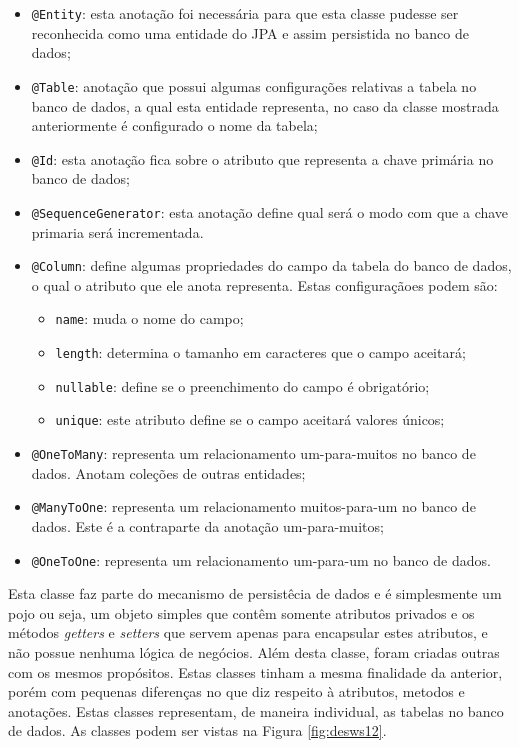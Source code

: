 	\begin{itemize}
	  \item \texttt{@Entity}: esta anotação foi necessária para que esta classe
	  pudesse ser reconhecida como uma entidade do JPA e assim persistida no banco
	  de dados;
	  \item \texttt{@Table}: anotação que possui algumas configurações relativas a
	  tabela no banco de dados, a qual esta entidade representa, no caso da classe
	  mostrada anteriormente é configurado o nome da tabela;
	  \item \texttt{@Id}: esta anotação fica sobre o atributo que representa a
	  chave primária no banco de dados;
	  \item \texttt{@SequenceGenerator}: esta anotação define qual será o modo com
	  que a chave primaria será incrementada.
	  \item \texttt{@Column}: define algumas propriedades do campo da tabela do
	  banco de dados, o qual o atributo que ele anota representa. Estas
	  configuraçãoes podem são:
		  	\begin{itemize}
		    	\item \texttt{name}: muda o nome do campo;
		    	\item \texttt{length}: determina o tamanho em caracteres que o campo
		    	aceitará;
		    	\item \texttt{nullable}: define se o preenchimento do campo é obrigatório;
		    	\item \texttt{unique}: este atributo define se o campo aceitará valores
		    	únicos;
		    \end{itemize}
	  \item \texttt{@OneToMany}: representa um relacionamento um-para-muitos no
	  banco de dados. Anotam coleções de outras entidades;
	  \item \texttt{@ManyToOne}: representa um relacionamento
	  muitos-para-um no banco de dados. Este é a contraparte da anotação
	  um-para-muitos;
	  \item \texttt{@OneToOne}: representa um relacionamento um-para-um no banco de
	  dados.
\end{itemize}
 
	\par Esta classe faz parte do mecanismo de persistêcia de dados e é
simplesmente um  pojo ou seja, um objeto  simples que contêm somente atributos
privados e os métodos \textit{getters} e \textit{setters} que servem apenas
para encapsular estes atributos, e não possue nenhuma lógica de negócios. Além
desta classe, foram criadas outras com os mesmos propósitos. Estas classes
tinham a mesma finalidade da anterior, porém com pequenas diferenças no que diz
respeito à atributos, metodos e anotações. Estas classes representam, de
maneira individual, as tabelas no banco de dados. As classes podem ser vistas
na Figura \ref{fig:desws12}.
	

